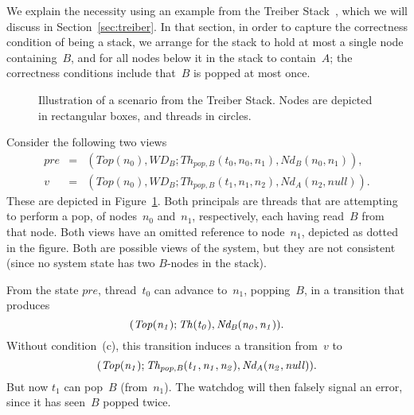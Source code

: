 We explain the necessity using an example from the Treiber
Stack~\cite{treiber}, which we will discuss in Section~\ref{sec:treiber}.  In
that section, in order to capture the correctness condition of being a stack,
we arrange for the stack to hold at most a single node containing~$B$, and for
all nodes below it in the stack to contain~$A$; the correctness conditions
include that~$B$ is popped at most once.


\begin{figure}\small
\def\addLabel#1#2{\draw #1++(0,0.5) node {#2};}
\begin{center}
\end{center}
\caption{Illustration of a scenario from the Treiber Stack.  Nodes are
  depicted in rectangular boxes, and threads in circles.}
\label{fig:missingCommon}
\end{figure}


Consider the following two views
%
\begin{eqnarray*}
pre & = &  (Top(n_0), WD_B; Th_{pop,B}(t_0, n_0, n_1), Nd_B(n_0, n_1)), \\
v & = & (Top(n_0), WD_B; Th_{pop,B}(t_1, n_1, n_2), Nd_A(n_2, null)).
\end{eqnarray*}
%
These are depicted in Figure~\ref{fig:missingCommon}.  Both principals are
threads that are attempting to perform a pop, of nodes~$n_0$ and~$n_1$,
respectively, each having read~$B$ from that node.  Both views have an omitted
reference to node~$n_1$, depicted as dotted in the figure.  Both are possible
views of the system, but they are not consistent (since no system state has
two $B$-nodes in the stack).

From the state $pre$, thread~$t_0$ can advance  to~$n_1$,
popping~$B$, in a transition that produces
\[\mit
(Top(n_1); Th(t_0), Nd_B(n_0, n_1)).
\]
Without condition~(c), this transition  induces a transition from~$v$ to
\[\mit
(Top(n_1); Th_{pop,B}(t_1, n_1, n_2), Nd_A(n_2, null)).
\]
But now $t_1$ can pop~$B$ (from~$n_1$).  The watchdog will then falsely signal
an error, since it has seen~$B$ popped twice. 

